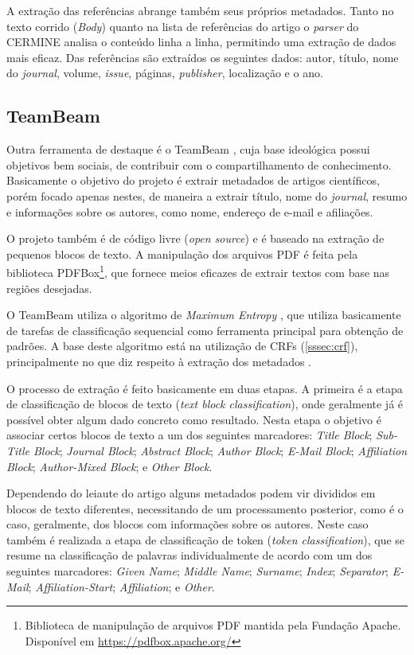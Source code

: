 A extração das referências abrange também seus próprios metadados. Tanto no texto corrido (\textit{Body}) quanto na lista de referências do artigo o \textit{parser} do CERMINE analisa o conteúdo linha a linha, permitindo uma extração de dados mais eficaz. Das referências são extraídos os seguintes dados: autor, título, nome do \textit{journal}, volume, \textit{issue}, páginas, \textit{publisher}, localização e o ano.

\subsection{TeamBeam}
\label{ssec:teambeam}

Outra ferramenta de destaque é o TeamBeam \cite{teambeam}, cuja base ideológica possui objetivos bem sociais, de contribuir com o compartilhamento de conhecimento. Basicamente o objetivo do projeto é extrair metadados de artigos científicos, porém focado apenas nestes, de maneira a extrair título, nome do \textit{journal}, resumo e informações sobre os autores, como nome, endereço de e-mail e afiliações.

O projeto também é de código livre (\textit{open source}) e é baseado na extração de pequenos blocos de texto. A manipulação dos arquivos PDF é feita pela biblioteca PDFBox\footnote{Biblioteca de manipulação de arquivos PDF mantida pela Fundação Apache. Disponível em \url{https://pdfbox.apache.org/}}, que fornece meios eficazes de extrair textos com base nas regiões desejadas.

O TeamBeam utiliza o algoritmo de \textit{Maximum Entropy} \cite{maximum-entropy}, que utiliza basicamente de tarefas de classificação sequencial como ferramenta principal para obtenção de padrões. A base deste algoritmo está na utilização de CRFs (\autoref{sssec:crf}), principalmente no que diz respeito à extração dos metadados \cite{Peng-CRF-IE}.

O processo de extração é feito basicamente em duas etapas. A primeira é a etapa de classificação de blocos de texto (\textit{text block classification}), onde geralmente já é possível obter algum dado concreto como resultado. Nesta etapa o objetivo é associar certos blocos de texto a um dos seguintes marcadores: \textit{Title Block}; \textit{Sub-Title Block}; \textit{Journal Block}; \textit{Abstract Block}; \textit{Author Block}; \textit{E-Mail Block}; \textit{Affiliation Block}; \textit{Author-Mixed Block}; e \textit{Other Block}.

Dependendo do leiaute do artigo alguns metadados podem vir divididos em blocos de texto diferentes, necessitando de um processamento posterior, como é o caso, geralmente, dos blocos com informações sobre os autores. Neste caso também é realizada a etapa de classificação de token (\textit{token classification}), que se resume na classificação de palavras individualmente de acordo com um dos seguintes marcadores: \textit{Given Name}; \textit{Middle Name}; \textit{Surname}; \textit{Index}; \textit{Separator}; \textit{E-Mail}; \textit{Affiliation-Start}; \textit{Affiliation}; e \textit{Other}.

